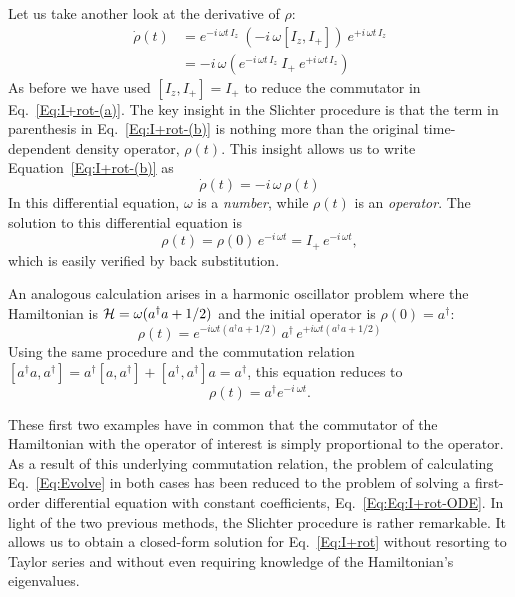  Let us take another look at the derivative of $\rho$:
\begin{subequations}  
\begin{align}
\dot{\rho}(t)
	& = e^{-i \, \omega t \, I_z} \: 
		(-i \, \omega [I_z,I_{+}] ) 
		\: e^{+i \, \omega t \, I_z} 
		\label{Eq:I+rot-(a)} \\
	& = -i \, \omega \left( 
			e^{-i \, \omega t \, I_z} \: I_{+} \: e^{+i \, \omega t \, I_z} 
		\right)
		\label{Eq:I+rot-(b)}
\end{align}
\end{subequations} 
As before we have used $[I_z,I_{+}] = I_{+}$ to reduce the commutator in Eq.~\ref{Eq:I+rot-(a)}.  The key insight in the Slichter procedure is that the term in parenthesis in Eq.~\ref{Eq:I+rot-(b)} is nothing more than the original time-dependent density operator, $\rho(t)$.  This insight allows us to write Equation~\ref{Eq:I+rot-(b)} as
\begin{equation}
\dot{\rho}(t) 
	= -i \, \omega \, \rho(t)
	\label{Eq:Eq:I+rot-ODE}
\end{equation}
In this differential equation, $\omega$ is a \emph{number}, while $\rho(t)$ is an \emph{operator}.  The solution to this differential equation is
\begin{equation}
\rho(t) 
	= \rho(0) \, e^{-i \, \omega t}
 	= I_{+} \, e^{-i \, \omega t},
	\label{Eq:I+rot-soln}
\end{equation}
which is easily verified by back substitution. 

 An analogous calculation arises in a harmonic oscillator problem where the Hamiltonian is ${\cal H} = \omega (a^{\dagger} a + 1/2)$ and the initial operator is $\rho(0) = a^{\dagger}$: 
\begin{equation}
\rho(t) 
	= e^{-i \omega t (a^{\dagger} a + 1/2)} 
		\, a^{\dagger} 
		\, e^{+i \omega t (a^{\dagger} a + 1/2)}
		\label{Eq:adaggerrot-soln}
\end{equation}
Using the same procedure and the commutation relation $[a^{\dagger} a,a^{\dagger}] = a^{\dagger} [a, a^{\dagger}] + [a^{\dagger}, a^{\dagger}] a = a^{\dagger}$, this equation reduces to 
\begin{equation}
	\rho(t)  = a^{\dagger} e^{-i \: \omega t}.
\end{equation}

These first two examples have in common that the commutator of the Hamiltonian with the operator of interest is simply proportional to the operator. As a result of this underlying commutation relation, the problem of calculating Eq.~\ref{Eq:Evolve} in both cases has been reduced to the problem of solving a first-order differential equation with constant coefficients, Eq.~\ref{Eq:Eq:I+rot-ODE}.  In light of the two previous methods, the Slichter procedure is rather remarkable.  It allows us to obtain a closed-form solution for Eq.~\ref{Eq:I+rot} without resorting to Taylor series and without even requiring knowledge of the Hamiltonian's eigenvalues.    

